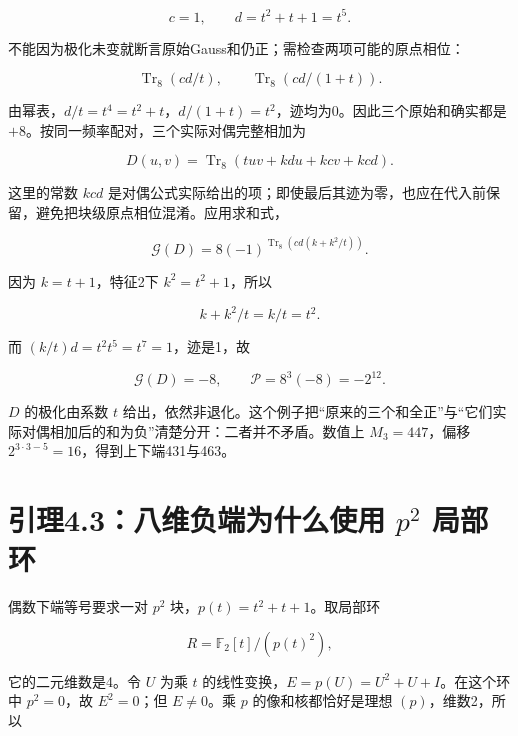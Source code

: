 \documentclass[UTF8,fontset=fandol,zihao=-4,openany,oneside]{ctexbook}
\begin{document}
\[
c=1,\qquad d=t^2+t+1=t^5.
\]



不能因为极化未变就断言原始Gauss和仍正；需检查两项可能的原点相位：



\[
\operatorname{Tr}_8(cd/t),\qquad\operatorname{Tr}_8(cd/(1+t)).
\]



由幂表，\(d/t=t^4=t^2+t\)，\(d/(1+t)=t^2\)，迹均为0。因此三个原始和确实都是 \(+8\)。按同一频率配对，三个实际对偶完整相加为



\[
D(u,v)=\operatorname{Tr}_8(tuv+kdu+kcv+kcd).
\]



这里的常数 \(kcd\) 是对偶公式实际给出的项；即使最后其迹为零，也应在代入前保留，避免把块级原点相位混淆。应用求和式，



\[
\mathcal G(D)=8(-1)^{\operatorname{Tr}_8(cd(k+k^2/t))}.
\]



因为 \(k=t+1\)，特征2下 \(k^2=t^2+1\)，所以



\[
k+k^2/t=k/t=t^2.
\]



而 \((k/t)d=t^2t^5=t^7=1\)，迹是1，故



\[
\mathcal G(D)=-8,\qquad \mathcal P=8^3(-8)=-2^{12}.
\]



\(D\) 的极化由系数 \(t\) 给出，依然非退化。这个例子把“原来的三个和全正”与“它们实际对偶相加后的和为负”清楚分开：二者并不矛盾。数值上 \(M_3=447\)，偏移 \(2^{3\cdot3-5}=16\)，得到上下端431与463。



\section{引理4.3：八维负端为什么使用 \texorpdfstring{\(p^2\)}{p2} 局部环}


偶数下端等号要求一对 \(p^2\) 块，\(p(t)=t^2+t+1\)。取局部环



\[
R=\mathbb F_2[t]/(p(t)^2),
\]



它的二元维数是4。令 \(U\) 为乘 \(t\) 的线性变换，\(E=p(U)=U^2+U+I\)。在这个环中 \(p^2=0\)，故 \(E^2=0\)；但 \(E\ne0\)。乘 \(p\) 的像和核都恰好是理想 \((p)\)，维数2，所以
\end{document}
